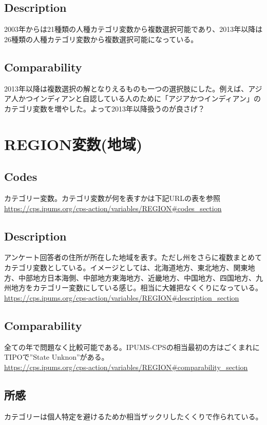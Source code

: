 \documentclass{jsarticle}
\begin{document}
\subsection{Description}
2003年からは21種類の人種カテゴリ変数から複数選択可能であり、2013年以降は26種類の人種カテゴリ変数から複数選択可能になっている。

\subsection{Comparability}
2013年以降は複数選択の解となりえるものも一つの選択肢にした。例えば、アジア人かつインディアンと自認している人のために「アジアかつインディアン」のカテゴリ変数を増やした。よって2013年以降扱うのが良さげ？

\section{REGION変数(地域)}

\subsection{Codes}
カテゴリー変数。カテゴリ変数が何を表すかは下記URLの表を参照\\
\url{https://cps.ipums.org/cps-action/variables/REGION#codes_section}

\subsection{Description}
アンケート回答者の住所が所在した地域を表す。ただし州をさらに複数まとめてカテゴリ変数としている。イメージとしては、北海道地方、東北地方、関東地方、中部地方日本海側、中部地方東海地方、近畿地方、中国地方、四国地方、九州地方をカテゴリー変数にしている感じ。相当に大雑把なくくりになっている。\\
\url{https://cps.ipums.org/cps-action/variables/REGION#description_section}

\subsection{Comparability}
全ての年で問題なく比較可能である。IPUMS-CPSの相当最初の方はごくまれにTIPOで”State Unknon”がある。\\
\url{https://cps.ipums.org/cps-action/variables/REGION#comparability_section}

\subsection{所感}
カテゴリーは個人特定を避けるためか相当ザックリしたくくりで作られている。
\end{document}

